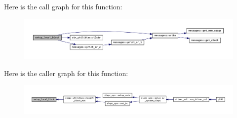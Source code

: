 Here is the call graph for this function\+:\nopagebreak
\begin{figure}[H]
\begin{center}
\leavevmode
\includegraphics[width=350pt]{SLEPC__utilities_8f90_a711d6be49d3b1542ee3375bceb5b4e6d_cgraph}
\end{center}
\end{figure}
Here is the caller graph for this function\+:\nopagebreak
\begin{figure}[H]
\begin{center}
\leavevmode
\includegraphics[width=350pt]{SLEPC__utilities_8f90_a711d6be49d3b1542ee3375bceb5b4e6d_icgraph}
\end{center}
\end{figure}
